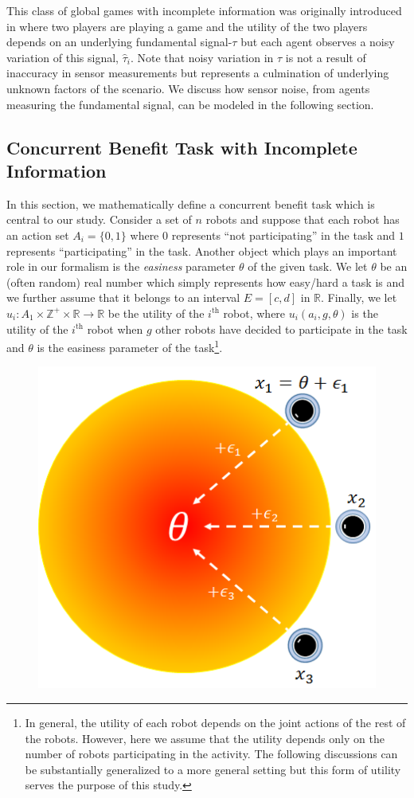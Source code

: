 \documentclass[conference]{ieeeconf}
\def\Z{\mathbb{Z}}
\def\R{\mathbb{R}}
\def\estt{\hat{\tau}}
\begin{document}
This class of global games with incomplete information was originally introduced in \cite{Carlsson1993} where two players are playing a game and the utility of the two players depends on an underlying fundamental signal-$\tau$ but each agent observes a noisy variation of this signal, $\estt_i$. Note that noisy variation in $\tau$ is not a result of inaccuracy in sensor measurements but represents a culmination of underlying unknown factors of the scenario. We discuss how sensor noise, from agents measuring the fundamental signal, can be modeled in the following section.

\subsection{Concurrent Benefit Task with Incomplete Information}\label{sec:conbenefit}
In this section, we mathematically define a concurrent benefit task which is central to our study. Consider a set of $n$ robots and suppose that each robot has an action set $A_i=\{0,1\}$ where $0$ represents ``not participating'' in the task and $1$ represents ``participating'' in the task.  Another object which plays an important role in our formalism is the \textit{easiness} parameter $\theta$ of the given task. We let $\theta$ be an (often random) real number which simply represents how easy/hard a task is and we further assume that it belongs to an interval $E=[c,d]$ in $\R$.  Finally, we let $u_i:A_1\times\Z^+\times \R\to \R$ be the utility of the $i^{\text{th}}$ robot, where $u_i(a_i,g,\theta)$ is the utility of the $i^{\text{th}}$ robot when $g$ other robots have decided to participate in the task and $\theta$ is the easiness parameter of the task\footnote{In general, the utility of each robot depends on the joint actions of the rest of the robots. However, here we assume that the utility depends only on the number of robots participating in the activity. The following discussions can be substantially generalized to a more general setting but this form of utility serves the purpose of this study.}. 

\begin{figure}[!htb]
\centering\includegraphics[width=.75\columnwidth]{../figures/globalgamesetup.png}
\centering\caption{}\label{fig:ggsetup}
\end{figure}
\end{document}
